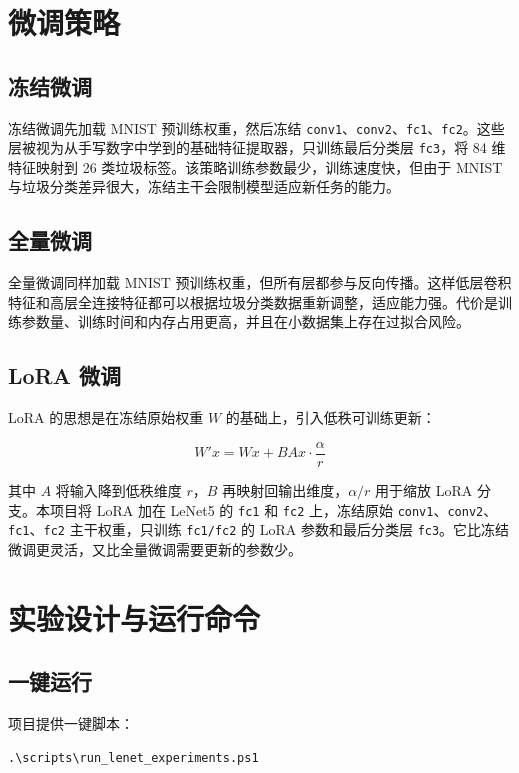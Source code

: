 \documentclass[UTF8,a4paper,zihao=-4]{ctexbook}
\begin{document}
\chapter{微调策略}

\section{冻结微调}

冻结微调先加载 MNIST 预训练权重，然后冻结 \texttt{conv1}、\texttt{conv2}、\texttt{fc1}、\texttt{fc2}。这些层被视为从手写数字中学到的基础特征提取器，只训练最后分类层 \texttt{fc3}，将 84 维特征映射到 26 类垃圾标签。该策略训练参数最少，训练速度快，但由于 MNIST 与垃圾分类差异很大，冻结主干会限制模型适应新任务的能力。

\section{全量微调}

全量微调同样加载 MNIST 预训练权重，但所有层都参与反向传播。这样低层卷积特征和高层全连接特征都可以根据垃圾分类数据重新调整，适应能力强。代价是训练参数量、训练时间和内存占用更高，并且在小数据集上存在过拟合风险。

\section{LoRA 微调}

LoRA 的思想是在冻结原始权重 $W$ 的基础上，引入低秩可训练更新：

\[
W' x = W x + B A x \cdot \frac{\alpha}{r}
\]

其中 $A$ 将输入降到低秩维度 $r$，$B$ 再映射回输出维度，$\alpha/r$ 用于缩放 LoRA 分支。本项目将 LoRA 加在 LeNet5 的 \texttt{fc1} 和 \texttt{fc2} 上，冻结原始 \texttt{conv1}、\texttt{conv2}、\texttt{fc1}、\texttt{fc2} 主干权重，只训练 \texttt{fc1/fc2} 的 LoRA 参数和最后分类层 \texttt{fc3}。它比冻结微调更灵活，又比全量微调需要更新的参数少。

\chapter{实验设计与运行命令}

\section{一键运行}

项目提供一键脚本：

\begin{verbatim}
.\scripts\run_lenet_experiments.ps1
\end{verbatim}
\end{document}
